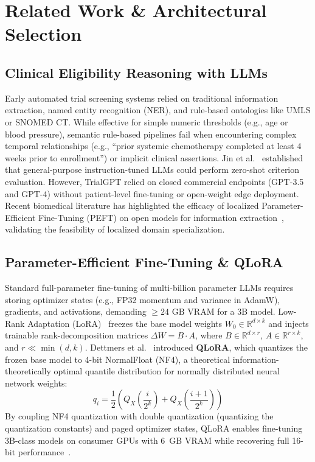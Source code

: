 \documentclass[conference]{IEEEtran}
\begin{document}
\section{Related Work \& Architectural Selection}
\label{sec:related_work}

\subsection{Clinical Eligibility Reasoning with LLMs}
Early automated trial screening systems relied on traditional information extraction, named entity recognition (NER), and rule-based ontologies like UMLS or SNOMED CT. While effective for simple numeric thresholds (e.g., age or blood pressure), semantic rule-based pipelines fail when encountering complex temporal relationships (e.g., ``prior systemic chemotherapy completed at least 4 weeks prior to enrollment'') or implicit clinical assertions. Jin et al.~\cite{jin2024trialgpt} established that general-purpose instruction-tuned LLMs could perform zero-shot criterion evaluation. However, TrialGPT relied on closed commercial endpoints (GPT-3.5 and GPT-4) without patient-level fine-tuning or open-weight edge deployment. Recent biomedical literature has highlighted the efficacy of localized Parameter-Efficient Fine-Tuning (PEFT) on open models for information extraction~\cite{yim2024clinical,estupinan2025parameter}, validating the feasibility of localized domain specialization.

\subsection{Parameter-Efficient Fine-Tuning \& QLoRA}
Standard full-parameter fine-tuning of multi-billion parameter LLMs requires storing optimizer states (e.g., FP32 momentum and variance in AdamW), gradients, and activations, demanding $\ge 24\text{ GB}$ VRAM for a 3B model. Low-Rank Adaptation (LoRA)~\cite{hu2022lora} freezes the base model weights $W_0 \in \mathbb{R}^{d \times k}$ and injects trainable rank-decomposition matrices $\Delta W = B \cdot A$, where $B \in \mathbb{R}^{d \times r}$, $A \in \mathbb{R}^{r \times k}$, and $r \ll \min(d, k)$. Dettmers et al.~\cite{dettmers2023qlora} introduced \textbf{QLoRA}, which quantizes the frozen base model to 4-bit NormalFloat (NF4), a theoretical information-theoretically optimal quantile distribution for normally distributed neural network weights:
\begin{equation}
    q_i = \frac{1}{2} \left( Q_X\left(\frac{i}{2^k}\right) + Q_X\left(\frac{i+1}{2^k}\right) \right)
\end{equation}
By coupling NF4 quantization with double quantization (quantizing the quantization constants) and paged optimizer states, QLoRA enables fine-tuning 3B-class models on consumer GPUs with 6~GB VRAM while recovering full 16-bit performance~\cite{dettmers2023qlora}.
\end{document}
